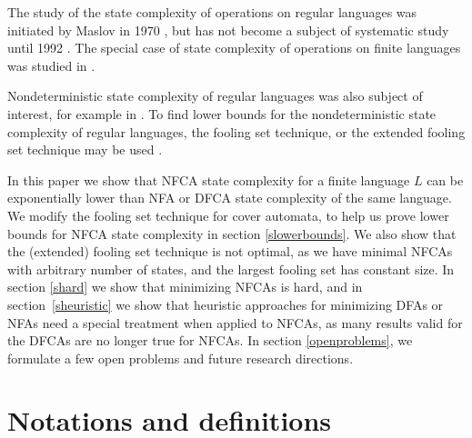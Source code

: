 \documentclass[submission,copyright,creativecommons]{eptcs}
\begin{document}
The study of the state complexity of operations on regular languages was initiated 
by Maslov in 1970 \cite{maslov,maslov1}, but has not become 
a subject of systematic study until 1992 \cite{KaiShengsc92}.
The special case of state complexity of operations 
on finite languages was studied in \cite{finiteop}.

Nondeterministic state complexity of regular languages 
was also subject of interest, for example in 
\cite{holzerKutribNFA,holzerKutribUnary,holzerKutribLata09,holzerKutribNFA09}.
To find lower bounds for the nondeterministic 
state complexity of regular languages, the fooling set technique,
or the extended fooling set technique may 
be used \cite{birget,Shallit,GruberHolzerNFAHard}.

In this paper we show that NFCA state complexity 
for a finite language $L$ can be exponentially lower 
than NFA or DFCA state complexity of the same language.
We modify the fooling set technique for cover automata, 
to help us prove lower bounds for NFCA state complexity
in section \ref{slowerbounds}. We also show that the (extended) fooling set technique 
is not optimal, as we have minimal NFCAs with arbitrary number of states, and the largest fooling set 
has constant size.
In section \ref{shard} we show that minimizing NFCAs is hard, and in section~\ref{sheuristic}
we show that heuristic approaches for minimizing DFAs or NFAs need a special treatment
 when applied to NFCAs, as many results valid for the DFCAs are no longer true for NFCAs.
In section \ref{openproblems}, we formulate a few open problems and future research directions.

\section{Notations and definitions}
\end{document}
